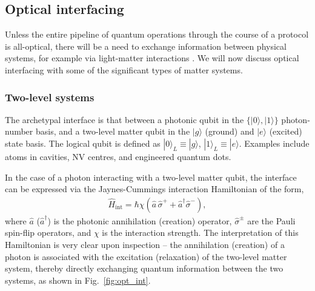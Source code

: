 \documentclass[aps, rmp, twocolumn, amsmath, amssymb, nofootinbib, superscriptaddress, longbibliography, floatfix, table-of-contents, eqsecnum]{revtex4-1}
\newcommand{\ket}[1]{|#1\rangle}
\newcommand{\comment}[1]{{\color{blue}{\textbf{#1}}}}
\begin{document}
\comment{To do!}

%
%

\subsection{Optical interfacing} \label{sec:opt_inter} 

Unless the entire pipeline of quantum operations through the course of a protocol is all-optical, there will be a need to exchange information between physical systems, for example via light-matter interactions \cite{bib:Cohen-Tannoudji92}. We will now discuss optical interfacing with some of the significant types of matter systems.

%
%

\subsubsection{Two-level systems} 

The archetypal interface is that between a photonic qubit in the \mbox{$\{\ket{0},\ket{1}\}$} photon-number basis, and a two-level matter qubit in the $\ket{g}$ (ground) and $\ket{e}$ (excited) state basis. The logical qubit is defined as \mbox{$\ket{0}_L\equiv\ket{g}$}, \mbox{$\ket{1}_L\equiv\ket{e}$}. Examples include atoms in cavities, NV centres, and engineered quantum dots.

In the case of a photon interacting with a two-level matter qubit, the interface can be expressed via the Jaynes-Cummings interaction Hamiltonian of the form,
\begin{align} \label{eq:two_level_hamil}
\hat{H}_\text{int} = \hbar \chi (\hat{a}\,\hat\sigma^+ + \hat{a}^\dag\hat\sigma^-),
\end{align}
where $\hat{a}$ ($\hat{a}^\dag$) is the photonic annihilation (creation) operator, $\hat\sigma^\pm$ are the Pauli spin-flip operators, and $\chi$ is the interaction strength. The interpretation of this Hamiltonian is very clear upon inspection -- the annihilation (creation) of a photon is associated with the excitation (relaxation) of the two-level matter system, thereby directly exchanging quantum information between the two systems, as shown in Fig.~\ref{fig:opt_int}.
\end{document}
